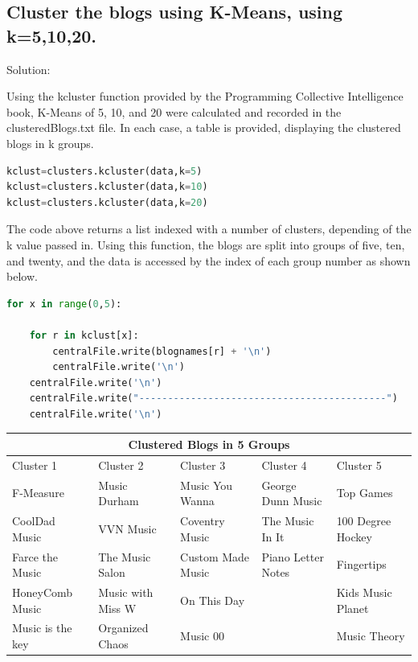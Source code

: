 \documentclass[11pt]{scrartcl} %
\begin{document}
\subsection*{  Cluster the blogs using K-Means, using k=5,10,20.}

\bigskip\bigskip
\LARGE Solution: \newline\newline\small


\tabto{2.0cm} Using the kcluster function provided by the Programming Collective Intelligence book, K-Means of 5, 10, and 20 were calculated and recorded in the clusteredBlogs.txt file. In each case, a table is provided, displaying the clustered blogs in k groups. 

\begin{lstlisting}[language = Python, caption= Clustering into 5 groups]
kclust=clusters.kcluster(data,k=5)
kclust=clusters.kcluster(data,k=10)
kclust=clusters.kcluster(data,k=20)
\end{lstlisting}

\tabto{2.0cm} The code above returns a list indexed with a number of clusters, depending of the k value passed in. Using this function, the blogs are split into groups of five, ten, and twenty, and the data is accessed by the index of each group number as shown below.

\begin{lstlisting}[language = Python, caption= Clustering into 5 groups]
for x in range(0,5):

	for r in kclust[x]:
		centralFile.write(blognames[r] + '\n')
		centralFile.write('\n')
	centralFile.write('\n')
	centralFile.write("-------------------------------------------")
	centralFile.write('\n')
\end{lstlisting}


\begin{flushleft}
\begin{tabular}{ |p{2.8cm}||p{3.5cm}||p{2.8cm}||p{3cm}||p{3cm}|}
 \hline
 \multicolumn{5}{|c|}{Clustered Blogs in 5 Groups} \\
 \hline
 Cluster 1 & Cluster 2 & Cluster 3 & Cluster 4 & Cluster 5\\
 \hline
  F-Measure & Music Durham & Music You Wanna & George Dunn Music & Top Games  \\
  CoolDad Music & VVN Music & Coventry Music & The Music In It & 100 Degree Hockey\\
  Farce the Music & The Music Salon & Custom Made Music & Piano Letter Notes & Fingertips\\
  HoneyComb Music & Music with Miss W & On This Day & & Kids Music Planet\\
  Music is the key & Organized Chaos & Music 00 & & Music Theory \\
 \hline
\end{tabular}
\end{flushleft}
\end{document}
